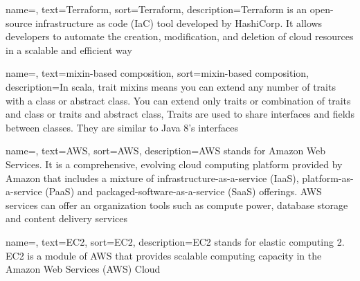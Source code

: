 
\renewcommand{\acronymname}{Acronyms and abbreviations}




%


{
    name=,
    text=Terraform,
    sort=Terraform,
    description={Terraform is an open-source infrastructure as code (IaC) tool developed by HashiCorp. It allows developers to automate the creation, modification, and deletion of cloud resources in a scalable and efficient way }
}

{
    name=,
    text=mixin-based composition,
    sort=mixin-based composition,
    description={In scala, trait mixins means you can extend any number of traits with a class or abstract class. You can extend only traits or combination of traits and class or traits and abstract class,
    Traits are used to share interfaces and fields between classes. They are similar to Java 8’s interfaces }
}

{
    name=,
    text=AWS,
    sort=AWS,
    description={AWS stands for Amazon Web Services. It is a comprehensive, evolving cloud computing platform provided by Amazon that includes a mixture of infrastructure-as-a-service (IaaS), platform-as-a-service (PaaS) and packaged-software-as-a-service (SaaS) offerings. AWS services can offer an organization tools such as compute power, database storage and content delivery services}
}


{
    name=,
    text=EC2,
    sort=EC2,
    description={EC2 stands for elastic computing 2. EC2 is a module of AWS that provides scalable computing capacity in the Amazon Web Services (AWS) Cloud }
}

